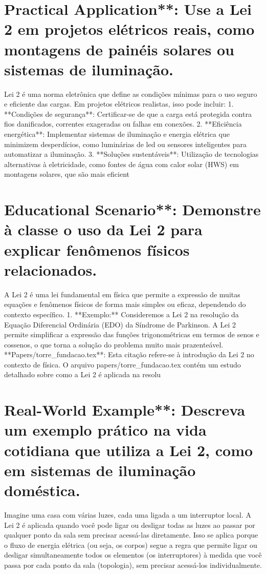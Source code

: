 \documentclass[11pt,a4paper]{article}
\begin{document}
\section{Practical Application**: Use a Lei 2 em projetos elétricos reais, como montagens de painéis solares ou sistemas de iluminação.}
Lei 2 é uma norma eletrônica que define as condições mínimas para o uso seguro e eficiente das cargas. Em projetos elétricos realistas, isso pode incluir: 1. **Condições de segurança**: Certificar-se de que a carga está protegida contra fios danificados, correntes exageradas ou falhas em conexões. 2. **Eficiência energética**: Implementar sistemas de iluminação e energia elétrica que minimizem desperdícios, como luminárias de led ou sensores inteligentes para automatizar a iluminação. 3. **Soluções sustentáveis**: Utilização de tecnologias alternativas à eletricidade, como fontes de água com calor solar (HWS) em montagens solares, que são mais eficient

\section{Educational Scenario**: Demonstre à classe o uso da Lei 2 para explicar fenômenos físicos relacionados.}
A Lei 2 é uma lei fundamental em física que permite a expressão de muitas equações e fenômenos físicos de forma mais simples ou eficaz, dependendo do contexto específico. 1. **Exemplo:** Consideremos a Lei 2 na resolução da Equação Diferencial Ordinária (EDO) da Síndrome de Parkinson. A Lei 2 permite simplificar a expressão das funções trigonométricas em termos de senos e cossenos, o que torna a solução do problema muito mais prazenteável. **Papers/torre\_fundacao.tex**: Esta citação refere-se à introdução da Lei 2 no contexto de física. O arquivo papers/torre\_fundacao.tex contém um estudo detalhado sobre como a Lei 2 é aplicada na resolu

\section{Real-World Example**: Descreva um exemplo prático na vida cotidiana que utiliza a Lei 2, como em sistemas de iluminação doméstica.}
Imagine uma casa com várias luzes, cada uma ligada a um interruptor local. A Lei 2 é aplicada quando você pode ligar ou desligar todas as luzes ao passar por qualquer ponto da sala sem precisar acessá-las diretamente. Isso se aplica porque o fluxo de energia elétrica (ou seja, os corpos) segue a regra que permite ligar ou desligar simultaneamente todos os elementos (os interruptores) à medida que você passa por cada ponto da sala (topologia), sem precisar acessá-los individualmente.
\end{document}
